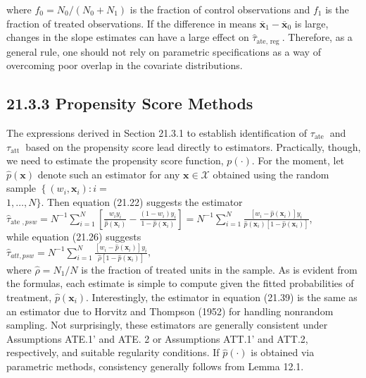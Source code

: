 \documentclass[10pt]{article}
\begin{document}
where $f_{0}=N_{0} /\left(N_{0}+N_{1}\right)$ is the fraction of control observations and $f_{1}$ is the fraction of treated observations. If the difference in means $\overline{\mathbf{x}}_{1}-\overline{\mathbf{x}}_{0}$ is large, changes in the slope estimates can have a large effect on $\hat{\tau}_{\text {ate, reg }}$. Therefore, as a general rule, one should not rely on parametric specifications as a way of overcoming poor overlap in the covariate distributions.

\subsection*{21.3.3 Propensity Score Methods}
The expressions derived in Section 21.3.1 to establish identification of $\tau_{\text {ate }}$ and $\tau_{\text {att }}$ based on the propensity score lead directly to estimators. Practically, though, we need to estimate the propensity score function, $p(\cdot)$. For the moment, let $\hat{p}(\mathbf{x})$ denote such an estimator for any $\mathbf{x} \in \mathscr{X}$ obtained using the random sample $\left\{\left(w_{i}, \mathbf{x}_{i}\right): i=\right.$\\
$1, \ldots, N\}$. Then equation (21.22) suggests the estimator\\
$\hat{\tau}_{\text {ate }, p s w}=N^{-1} \sum_{i=1}^{N}\left[\frac{w_{i} y_{i}}{\hat{p}\left(\mathbf{x}_{i}\right)}-\frac{\left(1-w_{i}\right) y_{i}}{1-\hat{p}\left(\mathbf{x}_{i}\right)}\right]=N^{-1} \sum_{i=1}^{N} \frac{\left[w_{i}-\hat{p}\left(\mathbf{x}_{i}\right)\right] y_{i}}{\hat{p}\left(\mathbf{x}_{i}\right)\left[1-\hat{p}\left(\mathbf{x}_{i}\right)\right]}$,\\
while equation (21.26) suggests\\
$\hat{\tau}_{a t t, p s w}=N^{-1} \sum_{i=1}^{N} \frac{\left[w_{i}-\hat{p}\left(\mathbf{x}_{i}\right)\right] y_{i}}{\hat{\rho}\left[1-\hat{p}\left(\mathbf{x}_{i}\right)\right]}$,\\
where $\hat{\rho}=N_{1} / N$ is the fraction of treated units in the sample. As is evident from the formulas, each estimate is simple to compute given the fitted probabilities of treatment, $\hat{p}\left(\mathbf{x}_{i}\right)$. Interestingly, the estimator in equation (21.39) is the same as an estimator due to Horvitz and Thompson (1952) for handling nonrandom sampling. Not surprisingly, these estimators are generally consistent under Assumptions ATE.1' and ATE. 2 or Assumptions ATT.1' and ATT.2, respectively, and suitable regularity conditions. If $\hat{p}(\cdot)$ is obtained via parametric methods, consistency generally follows from Lemma 12.1.
\end{document}
